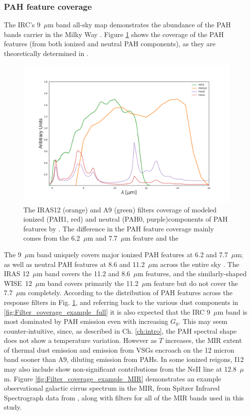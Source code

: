        \subsubsection{PAH feature coverage}
         The IRC's 9~$\mu$m band all-sky map demonstrates the abundance of the PAH bands carrier in the Milky Way \citep{ishihara10}. Figure \ref{fig:Filter_coverage_example_PAH} shows the coverage of the PAH features (from both ionized and neutral PAH components), as they are theoretically determined in \cite{dustem11}.
            \begin{figure}
              \centering
              \includegraphics[width=\textwidth]{../Plots/ch_datasources/Filter_coverage_example_PAH.pdf}
              \caption{The IRAS12 (orange) and A9 (green) filters coverage of modeled ionized (PAH1, red) and neutral (PAH0, purple)components of PAH features by \cite{dustem11}. The difference in the PAH feature coverage mainly comes from the 6.2~$\mu$m and 7.7~$\mu$m feature and the }
              \label{fig:Filter_coverage_example_PAH}
            \end{figure}
         The 9~$\mu$m band uniquely covers major ionized PAH features at 6.2 and 7.7~$\mu$m; as well as neutral PAH features at 8.6 and 11.2~$\mu$m across the entire sky \citep{irc07}. The IRAS 12~$\mu$m band covers the 11.2 and 8.6~$\mu$m features, and the similarly-shaped WISE~12~$\mu$m band covers primarily the 11.2~$\mu{}$m feature but do not cover the 7.7~$\mu{}$m completely. According to the distribution of PAH features across the response filters in Fig. \ref{fig:Filter_coverage_example_PAH}, and referring back to the various dust components in \ref{fig:Filter_coverage_example_full} it is also expected that the IRC 9~$\mu{}$m band is most dominated by PAH emission even with increasing $G_{0}$. This may seem counter-intuitive, since, as described in Ch. \ref{ch:intro}, the PAH spectral shape does not show a temperature variation. However as $T$ increases, the MIR extent of thermal dust emission and emission from VSGs encroach on the 12 micron band sooner than A9, diluting emission from PAHs. In some ionized reigons, I12 may also include show non-significant contributions from the NeII line at 12.8~$\mu$m. Figure \ref{fig:Filter_coverage_example_MIR} demonstrates an example observational galactic cirrus spectrum in the MIR, from Spitzer Infrared Spectrograph \citep{spitzer04} data from \cite{...}, along with filters for all of the MIR bands used in this study.
